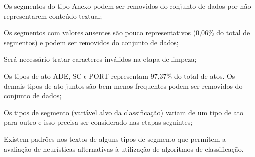 \begin{alineas}
	\item Os segmentos do tipo Anexo podem ser removidos do conjunto de dados por não representarem conteúdo textual;
	\item Os segmentos com valores ausentes são pouco representativos (0,06\% do total de segmentos) e podem ser removidos do conjunto de dados;
	\item Será necessário tratar caracteres inválidos na etapa de limpeza;
	\item Os tipos de ato ADE, SC e PORT representam 97,37\% do total de atos. Os demais tipos de ato juntos são bem menos frequentes podem ser removidos do conjunto de dados;	 
	\item Os tipos de segmento (variável alvo da classificação) variam de um tipo de ato para outro e isso precisa ser considerado nas etapas seguintes;
	\item Existem padrões nos textos de alguns tipos de segmento que permitem a avaliação de heurísticas alternativas à utilização de algoritmos de classificação.
\end{alineas}
